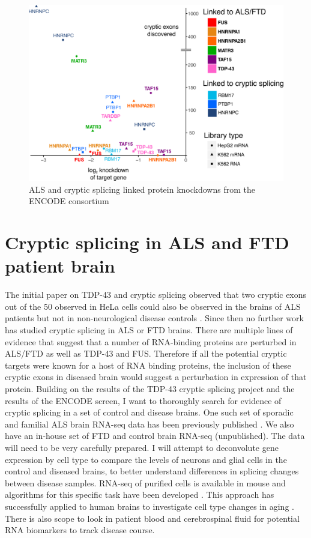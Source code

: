 \begin{figure}
	\begin{center}
		\includegraphics[width=12cm]{Figures/misc/ENCODE_summary.png}
	\end{center}
	\caption{ALS and cryptic splicing linked protein knockdowns from the ENCODE consortium  }
\end{figure} 

\section{Cryptic splicing in ALS and FTD patient brain}
The initial paper on TDP-43 and cryptic splicing observed that two cryptic exons out of the 50 observed in HeLa cells could also be observed in the brains of ALS patients but not in non-neurological disease controls \citep{Ling2015}. Since then no further work has studied cryptic splicing in ALS or FTD brains. There are multiple lines of evidence that suggest that a number of RNA-binding proteins are perturbed in ALS/FTD as well as TDP-43 and FUS. Therefore if all the potential cryptic targets were known for a host of RNA binding proteins, the inclusion of these cryptic exons in diseased brain would suggest a perturbation in expression of that protein. 
Building on the results of the TDP-43 cryptic splicing project and the results of the ENCODE screen, I want to thoroughly search for evidence of cryptic splicing in a set of control and disease brains. One such set of sporadic and familial ALS brain RNA-seq data has been previously published \citep{Prudencio2015}. We also have an in-house set of FTD and control brain RNA-seq (unpublished). The data will need to be very carefully prepared. I will attempt to deconvolute gene expression by cell type to compare the levels of neurons and glial cells in the control and diseased brains, to better understand differences in splicing changes between disease samples. RNA-seq of purified cells is available in mouse \citep{Newman2016} and algorithms for this specific task have been developed \citep{Zhang2014}. This approach has successfully applied to human brains to investigate cell type changes in aging \citep{Soreq2017}. There is also scope to look in patient blood and cerebrospinal fluid for potential RNA biomarkers to track disease course. 

